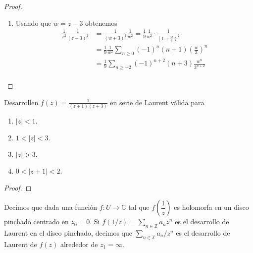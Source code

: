 \documentclass{article}
\newcommand{\Z}{\mathbb{Z}}
\newcommand{\C}{\mathbb{C}}
\newenvironment{theorem}[2][Ejercicio]{\begin{trivlist}
\item[\hskip\labelsep{\bfseries #1}\hskip\labelsep{\bfseries #2.}]}{\end{trivlist}}
\begin{document}
\begin{proof}
\begin{enumerate}
              por lo que \( \sqrt{1+z} \) es analítica en \( z = 0 \) si \( |z| < 1 \) y
              \begin{align*}
                  {(z+1)}^{1/2} & = \sum_{n \geq 0} \binom{1/2}{n} z^n    \\
                  \implies f(z) & = \sum_{n \geq 0} \binom{1/2}{n} z^{2n} \\
              \end{align*}
        \item Usando que \( w = z-3 \) obtenemos \begin{align*}
                  \frac{1}{z^2} \frac{1}{{(z-3)}^2} & = \frac{1}{{(w+3)}^2} \frac{1}{w^2} = \frac{1}{9} \frac{1}{w^2} \cdot \frac{1}{{\left( 1 + \frac{w}{3} \right)}^2} \\
                                                    & = \frac{1}{9} \frac{1}{w^2} \sum_{n \geq 0} {(-1)}^n (n+1) {\left( \frac{w}{3} \right)}^n                          \\
                                                    & = \frac{1}{9} \sum_{n \geq -2} {(-1)}^{n+2} (n+3) \frac{w^n}{3^{n+2}}                                              \\
              \end{align*}
    \end{enumerate}
\end{proof}

\vspace{0.25in}

\begin{theorem}{10}
    Desarrollen \( f(z) = \frac{1}{(z+1)(z+3)} \) en serie de Laurent válida para \begin{enumerate}
        \item \( |z| < 1 \).
        \item \( 1 < |z| < 3 \).
        \item \( |z| > 3 \).
        \item \( 0 < |z + 1| < 2 \).
    \end{enumerate}
\end{theorem}

\begin{proof}

\end{proof}

\vspace{0.25in}

Decimos que dada una función \( f: U \to \C \) tal que \( f\left(\dfrac{1}{z}\right) \) es holomorfa en un disco pinchado centrado en \( z_0 = 0 \). Si \( f(1/z) = \sum_{n \in \Z} a_n z^n \)
es el desarrollo de Laurent en el disco pinchado, decimos que \( \sum_{n \in \Z} a_n/z^n \) es el desarrollo de Laurent de \( f(z) \) alrededor de \( z_1 = \infty \).
\end{document}
